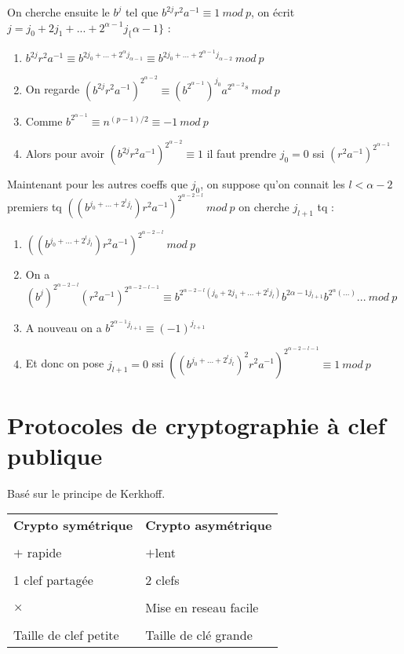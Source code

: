 \documentclass[12pt]{article}
\theoremstyle{plain}
\theoremstyle{definition}
\begin{document}
On cherche ensuite le $b^j$ tel que $b^{2j}r^2a^{-1}\equiv1~mod~p$, on écrit $j=j_0+2j_1+...+2^{\alpha-1}j_\{\alpha-1\}$ :
\begin{enumerate}
    \item $b^{2j}r^2a^{-1}\equiv b^{2j_0+...+2^{\alpha}j_{\alpha-1}}\equiv b^{2j_0+...+2^{\alpha-1}j_{\alpha-2}}~mod~p$
    \item On regarde $(b^{2j}r^2a^{-1})^{2^{\alpha-2}}\equiv (b^{2^{\alpha-1}})^{j_0}a^{2^{\alpha-2}s}~mod~p$
    \item Comme $b^{2^{\alpha-1}}\equiv n^{(p-1)/2}\equiv -1~mod~p$
    \item Alors pour avoir $(b^{2j}r^2a^{-1})^{2^{\alpha-2}}\equiv 1$ il faut prendre $j_0=0$ ssi $(r^2a^{-1})^{2^{\alpha-1}}$
\end{enumerate}
Maintenant pour les autres coeffs que $j_0$, on suppose qu'on connait les $l<\alpha-2$ premiers tq 
$((b^{j_0+...+2^{l}j_l})r^2a^{-1})^{2^{\alpha-2-l}}~mod~p$ on cherche $j_{l+1}$ tq :
\begin{enumerate}
    \item $((b^{j_0+...+2^{l}j_l})r^2a^{-1})^{2^{\alpha-2-l}}~mod~p$
    \item On a $(b^j)^{2^{\alpha-2-l}}(r^2a^{-1})^{2^{\alpha-2-l-1}}\equiv b^{2^{\alpha-2-l}(j_0+2j_1+...+2^lj_l)}b^{2{\alpha-1}j_{l+1}}b^{2^{\alpha}(...)}...~mod~p$
    \item A nouveau on a $b^{2^{\alpha-1}j_{l+1}}\equiv (-1)^{j_{l+1}}$
    \item Et donc on pose $j_{l+1}=0$ ssi $((b^{j_0+...+2^lj_l})^2r^2a^{-1})^{2^{\alpha-2-l-1}}\equiv 1~mod~p$
\end{enumerate}


\section{Protocoles de cryptographie à clef publique}
Basé sur le principe de Kerkhoff.\\
\newline
\begin{tabular}{M{8 cm}  M{8 cm}}
    \textbf{Crypto symétrique} & \textbf{Crypto asymétrique}\\
    \tabularnewline
    $+$ rapide & $+$lent\\
     clef partagée & $2$ clefs\\
    \tabularnewline
    $\times$ & Mise en reseau facile\\
    \tabularnewline
    Taille de clef petite & Taille de clé grande \\
\end{tabular}
\end{document}
